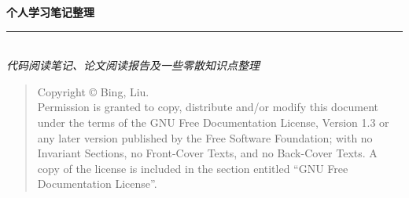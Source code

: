 \thispagestyle{empty}

\noindent\begin{minipage}{\textwidth}
\raggedleft
{\huge \bfseries 个人学习笔记整理}
\noindent\rule[-1ex]{\textwidth}{5pt}\\[2.5ex]
\hfill\emph{\large 代码阅读笔记、论文阅读报告及一些零散知识点整理}
\end{minipage}

\noindent{}


\newpage\thispagestyle{empty}
\begin{quote}\footnotesize
    Copyright \copyright{}  Bing, Liu. \\
    Permission is granted to copy, distribute and/or modify this document
    under the terms of the GNU Free Documentation License, Version 1.3
    or any later version published by the Free Software Foundation;
    with no Invariant Sections, no Front-Cover Texts, and no Back-Cover Texts.
    A copy of the license is included in the section entitled ``GNU
    Free Documentation License''.
\end{quote}